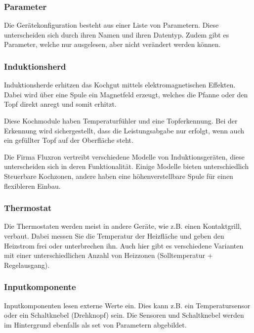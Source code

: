 \subsubsection{Parameter}
\label{subsubsec:Parameter}
Die Gerätekonfiguration besteht aus einer Liste von Parametern. Diese unterscheiden sich durch ihren Namen und ihren Datentyp. Zudem gibt es Parameter, welche nur ausgelesen, aber nicht verändert werden können.

\subsubsection{Induktionsherd}
\label{subsubsec:Induktionsherd}
Induktionsherde erhitzen das Kochgut mittels elektromagnetischen Effekten. Dabei wird über eine Spule ein Magnetfeld erzeugt, welches die Pfanne oder den Topf direkt anregt und somit erhitzt.

Diese Kochmodule haben Temperaturfühler und eine Topferkennung. Bei der Erkennung wird sichergestellt, dass die Leistungsabgabe nur erfolgt, wenn auch ein gefüllter Topf auf der Oberfläche steht.

Die Firma Fluxron vertreibt verschiedene Modelle von Induktionsgeräten, diese unterscheiden sich in deren Funktionalität. Einige Modelle bieten unterschiedlich Steuerbare Kochzonen, andere haben eine höhenverstellbare Spule für einen flexibleren Einbau.

\subsubsection{Thermostat}
\label{subsubsec:Thermostat}

Die Thermostaten werden meist in andere Geräte, wie z.B. einen Kontaktgrill, verbaut. Dabei messen Sie die Temperatur der Heizfläche und geben den Heizstrom frei oder unterbrechen ihn. Auch hier gibt es verschiedene Varianten mit einer unterschiedlichen Anzahl von Heizzonen (Solltemperatur + Regelausgang).

\subsubsection{Inputkomponente}
\label{subsubsec:Inputkomponente}

Inputkomponenten lesen externe Werte ein. Dies kann z.B. ein Temperatursensor oder ein Schaltknebel (Drehknopf) sein. Die Sensoren und Schaltknebel werden im Hintergrund ebenfalls als set von Parametern abgebildet.